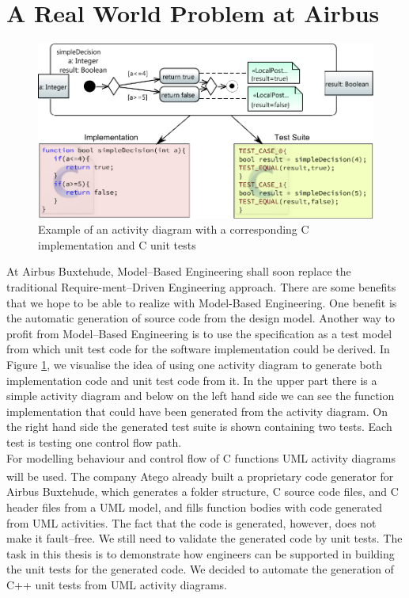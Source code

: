 \section{A Real World Problem at Airbus}
\begin{figure}
\label{fig:Act2Code+Tests}
\includegraphics[width=\textwidth]{./pics/Activity2Code+Test2.pdf}
\caption{Example of an activity diagram with a corresponding C implementation and C unit tests}
\end{figure}
At Airbus Buxtehude, Model--Based Engineering shall soon replace the traditional Require-ment--Driven Engineering approach. There are some benefits that we hope to be able to realize with Model-Based Engineering. One benefit is the automatic generation of source code from the design model. Another way to profit from Model--Based Engineering is to use the specification as a test model from which unit test code for the software implementation could be derived. In Figure \ref{fig:Act2Code+Tests}, we visualise the idea of using one activity diagram to generate both implementation code and unit test code from it. In the upper part there is a simple activity diagram and below on the left hand side we can see the function implementation that could have been generated from the activity diagram. On the right hand side the generated test suite is shown containing two tests. Each test is testing one control flow path.\\
For modelling behaviour and control flow of C functions UML activity diagrams will be used. The company Atego\textsuperscript{\textregistered} already built a proprietary code generator for Airbus Buxtehude, which generates a folder structure, C source code files, and C header files from a UML model, and fills function bodies with code generated from UML activities. The fact that the code is generated, however, does not make it fault--free. We still need to validate the generated code by unit tests. The task in this thesis is to demonstrate how engineers can be supported in building the unit tests for the generated code. We decided to automate the generation of C++ unit tests from UML activity diagrams.\\
